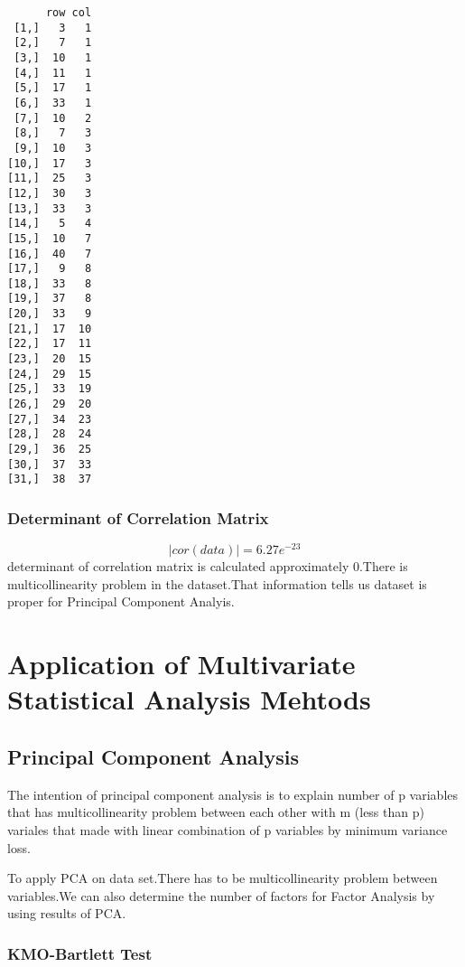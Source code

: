 \documentclass[12pt,twoside]{deuthesis}
\begin{document}
\begin{verbatim}
      row col
 [1,]   3   1
 [2,]   7   1
 [3,]  10   1
 [4,]  11   1
 [5,]  17   1
 [6,]  33   1
 [7,]  10   2
 [8,]   7   3
 [9,]  10   3
[10,]  17   3
[11,]  25   3
[12,]  30   3
[13,]  33   3
[14,]   5   4
[15,]  10   7
[16,]  40   7
[17,]   9   8
[18,]  33   8
[19,]  37   8
[20,]  33   9
[21,]  17  10
[22,]  17  11
[23,]  20  15
[24,]  29  15
[25,]  33  19
[26,]  29  20
[27,]  34  23
[28,]  28  24
[29,]  36  25
[30,]  37  33
[31,]  38  37
\end{verbatim}
\hypertarget{determinant-of-correlation-matrix}{%
\subsection{Determinant of Correlation Matrix}\label{determinant-of-correlation-matrix}}

\[ |cor(data)| = 6.27e^{-23}\]
determinant of correlation matrix is calculated approximately 0.There is multicollinearity problem in the dataset.That information tells us dataset is proper for Principal Component Analyis.

\hypertarget{application-of-multivariate-statistical-analysis-mehtods}{%
\chapter{Application of Multivariate Statistical Analysis Mehtods}\label{application-of-multivariate-statistical-analysis-mehtods}}

\hypertarget{principal-component-analysis}{%
\section{Principal Component Analysis}\label{principal-component-analysis}}

The intention of principal component analysis is to explain number of p variables that has multicollinearity problem between each other with m (less than p) variales that made with linear combination of p variables by minimum variance loss.\\

\setlength{\parindent}{0in}

To apply PCA on data set.There has to be multicollinearity problem between variables.We can also determine the number of factors for Factor Analysis by using results of PCA.

\hypertarget{kmo-bartlett-test}{%
\subsection{KMO-Bartlett Test}\label{kmo-bartlett-test}}
\end{document}

